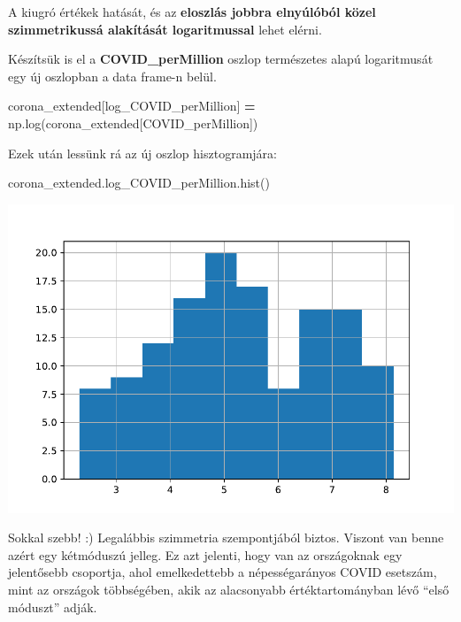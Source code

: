 \documentclass[
]{book}
\newenvironment{Shaded}{\begin{snugshade}}{\end{snugshade}}
\newcommand{\NormalTok}[1]{#1}
\newcommand{\OperatorTok}[1]{\textcolor[rgb]{0.81,0.36,0.00}{\textbf{#1}}}
\newcommand{\StringTok}[1]{\textcolor[rgb]{0.31,0.60,0.02}{#1}}
\begin{document}
A kiugró értékek hatását, és az \textbf{eloszlás jobbra elnyúlóból közel szimmetrikussá alakítását logaritmussal} lehet elérni.

Készítsük is el a \textbf{COVID\_perMillion} oszlop természetes alapú logaritmusát egy új oszlopban a data frame-n belül.

\begin{Shaded}
\begin{Highlighting}[]
\NormalTok{corona\_extended[}\StringTok{\textquotesingle{}log\_COVID\_perMillion\textquotesingle{}}\NormalTok{] }\OperatorTok{=}\NormalTok{ np.log(corona\_extended[}\StringTok{\textquotesingle{}COVID\_perMillion\textquotesingle{}}\NormalTok{])}
\end{Highlighting}
\end{Shaded}

Ezek után lessünk rá az új oszlop hisztogramjára:

\begin{Shaded}
\begin{Highlighting}[]
\NormalTok{corona\_extended.log\_COVID\_perMillion.hist()}
\end{Highlighting}
\end{Shaded}

\includegraphics{_main_files/figure-latex/unnamed-chunk-128-21.pdf}

Sokkal szebb! :) Legalábbis szimmetria szempontjából biztos. Viszont van benne azért egy kétmóduszú jelleg. Ez azt jelenti, hogy van az országoknak egy jelentősebb csoportja, ahol emelkedettebb a népességarányos COVID esetszám, mint az országok többségében, akik az alacsonyabb értéktartományban lévő ``első móduszt'' adják.
\end{document}
